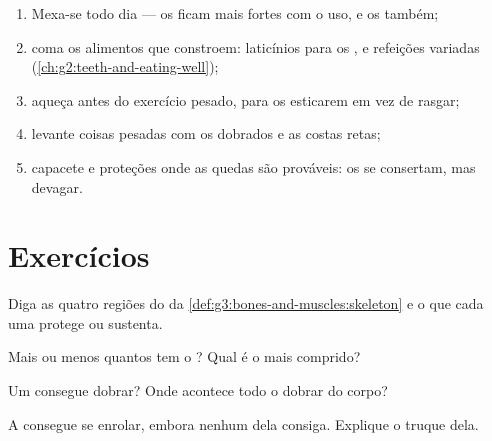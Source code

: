 \begin{method}\label{met:g3:bones-and-muscles:care}
\begin{enumerate}
  \item Mexa-se todo dia --- os  ficam mais fortes com o uso, e
        os  também;
  \item coma os alimentos que constroem: laticínios para os , e
        refeições variadas (\cref{ch:g2:teeth-and-eating-well});
  \item aqueça antes do exercício pesado, para os  esticarem
        em vez de rasgar;
  \item levante coisas pesadas com os  dobrados e as costas
        retas;
  \item capacete e proteções onde as quedas são prováveis: os 
        se consertam, mas devagar.
\end{enumerate}
\end{method}

\section{Exercícios}

\begin{exercise}[$\star$]\label{exo:g3:bones-and-muscles:1}
Diga as quatro regiões do  da
\cref{def:g3:bones-and-muscles:skeleton} e o que cada uma protege ou
sustenta.
\end{exercise}

\begin{exercise}[$\star$]\label{exo:g3:bones-and-muscles:2}
Mais ou menos quantos  tem o ? Qual é o mais comprido?
\end{exercise}

\begin{exercise}[$\star$]\label{exo:g3:bones-and-muscles:3}
Um  consegue dobrar? Onde acontece todo o dobrar do corpo?
\end{exercise}

\begin{exercise}[$\star$]\label{exo:g3:bones-and-muscles:4}
A  consegue se enrolar, embora nenhum  dela consiga.
Explique o truque dela.
\end{exercise}

